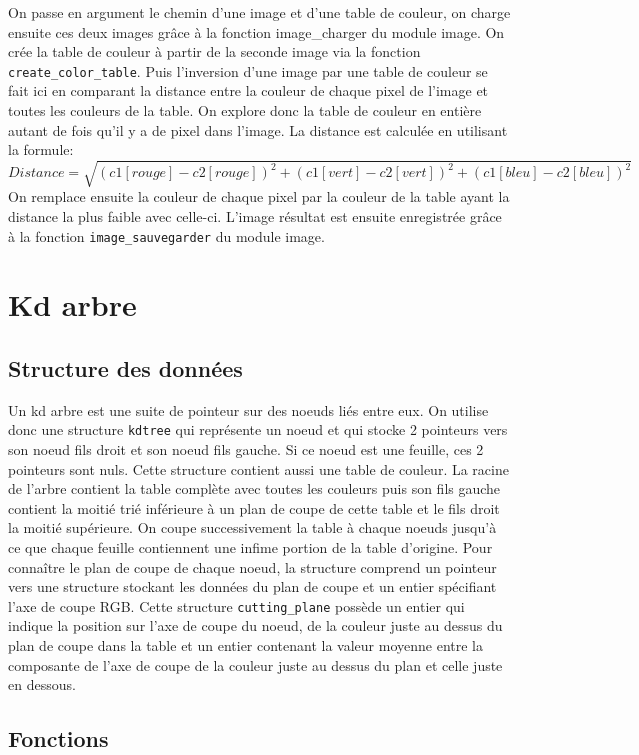\documentclass[a4paper,11pt,final]{article}
\begin{document}
On passe en argument le chemin d’une image et d’une table de couleur, on charge ensuite ces deux images grâce à la fonction image\_charger du module image. On crée la table de couleur à partir de la seconde image via la fonction \texttt{create\_color\_table}.
Puis l’inversion d’une image par une table de couleur se fait ici en comparant la distance entre la couleur de chaque pixel de l’image et toutes les couleurs de la table. On explore donc la table de couleur en entière autant de fois qu’il y a de pixel dans l’image. La distance est calculée en utilisant la formule:
\[
Distance = \sqrt{(c1[rouge]-c2[rouge])^2 + (c1[vert]-c2[vert])^2 + (c1[bleu]-c2[bleu])^2}
\]
On remplace ensuite la couleur de chaque pixel par la couleur de la table ayant la distance la plus faible avec celle-ci. L’image résultat est ensuite enregistrée grâce à la fonction \texttt{image\_sauvegarder} du module image.

\section{Kd arbre}

\subsection{Structure des données}

Un kd arbre est une suite de pointeur sur des noeuds liés entre eux. On utilise donc une structure \texttt{kdtree} qui représente un noeud et qui stocke 2 pointeurs vers son noeud fils droit et son noeud fils gauche. Si ce noeud est une feuille, ces 2 pointeurs sont nuls. Cette structure contient aussi une table de couleur. La racine de l’arbre contient la table complète avec toutes les couleurs puis son fils gauche contient la moitié trié inférieure à un plan de coupe de cette table et le fils droit la moitié supérieure. On coupe successivement la table à chaque noeuds jusqu’à ce que chaque feuille contiennent une infime portion de la table d’origine. Pour connaître le plan de coupe de chaque noeud, la structure comprend un pointeur vers une structure stockant les données du plan de coupe et un entier spécifiant l’axe de coupe RGB. Cette structure \texttt{cutting\_plane} possède un entier qui indique la position sur l’axe de coupe du noeud, de la couleur juste au dessus du plan de coupe dans la table et un entier contenant la valeur moyenne entre la composante de l’axe de coupe de la couleur juste au dessus du plan et celle juste en dessous.

\subsection{Fonctions}
\end{document}
